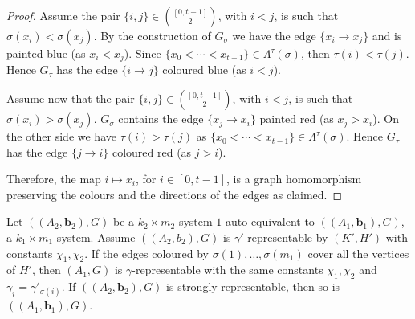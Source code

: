 \begin {proof} 
 Assume the pair $\{i,j\}\in {[0,t-1]\choose 2}$, with $i<j$, is such that $\sigma (x_i)<\sigma (x_j)$. By the construction of $G_{\sigma }$ we have the edge $\{x_i\to x_j\}$ and is painted blue (as $x_i<x_j$). Since $\{x_0<\cdots <x_{t-1}\}\in \Lambda ^{\tau }(\sigma )$, then $\tau (i)<\tau (j)$. Hence $G_\tau $ has the edge $\{i\to j\}$ coloured blue (as $i<j$). \par Assume now that the pair $\{i,j\}\in {[0,t-1]\choose 2}$, with $i<j$, is such that $\sigma (x_i)>\sigma (x_j)$. $G_{\sigma }$ contains the edge $\{x_j\to x_i\}$ painted red (as $x_j>x_i$). On the other side we have $\tau (i)>\tau (j)$ as $\{x_0<\cdots <x_{t-1}\}\in \Lambda ^{\tau }(\sigma )$. Hence $G_\tau $ has the edge $\{j\to i\}$ coloured red (as $j>i$). \par Therefore, the map $i\mapsto x_i$, for $i\in [0,t-1]$, is a graph homomorphism preserving the colours and the directions of the edges as claimed.
 \end {proof} 
 
 \begin {proposition} 
 \label {p.1-auto-equiv-rep} Let $((A_2,\mathbf {b}_2),G)$ be a $k_2\times m_2$ system $1$-auto-equivalent to $((A_1,\mathbf {b}_1),G)$, a $k_1\times m_1$ system. Assume $((A_2,b_2),G)$ is $\gamma '$-representable by $(K',H')$ with constants $\chi _1,\chi _2$. If the edges coloured by $\sigma (1),\ldots ,\sigma (m_1)$ cover all the vertices of $H'$, then $(A_1,G)$ is $\gamma $-representable with the same constants $\chi _1,\chi _2$ and $\gamma _i=\gamma '_{\sigma (i)}$. If $((A_2,\mathbf {b}_2),G)$ is strongly representable, then so is $((A_1,\mathbf {b}_1),G)$.
 \end {proposition} 
 
